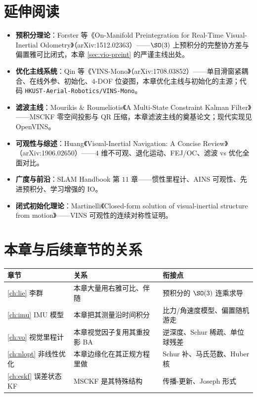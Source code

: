 \section*{延伸阅读}
\begin{itemize}
  \item \textbf{预积分理论}：Forster 等《On-Manifold Preintegration for Real-Time Visual-Inertial Odometry》\cite{forster2017preintegration}（arXiv:1512.02363）——$\SO(3)$ 上预积分的完整协方差与偏置雅可比闭式，本章 \cref{sec:vio-preint} 的严谨主线出处。
  \item \textbf{优化主线系统}：Qin 等《VINS-Mono》\cite{qin2018vins}（arXiv:1708.03852）——单目滑窗紧耦合、在线外参、初始化、$4$-DOF 位姿图，本章优化主线与初始化的主源；代码 \texttt{HKUST-Aerial-Robotics/\allowbreak VINS-Mono}。
  \item \textbf{滤波主线}：Mourikis \& Roumeliotis《A Multi-State Constraint Kalman Filter》\cite{mourikis2007msckf}——MSCKF 零空间投影与 QR 压缩，本章滤波主线的奠基论文；现代实现见 OpenVINS。
  \item \textbf{可观性与综述}：Huang《Visual-Inertial Navigation: A Concise Review》\cite{huang2019vins}（arXiv:1906.02650）——$4$ 维不可观、退化运动、FEJ/OC、滤波 vs 优化全面对比。
  \item \textbf{广度与前沿}：SLAM Handbook 第 $11$ 章\cite{carlone2026handbook}——惯性里程计、AINS 可观性、先进预积分、学习增强的 IO。
  \item \textbf{闭式初始化理论}：Martinelli《Closed-form solution of visual-inertial structure from motion》\cite{martinelli2014closed}——VINS 可观性的连续对称性证明。
\end{itemize}

\section*{本章与后续章节的关系}
\begin{table}[H]\centering\small
\begin{tabular}{lll}
\toprule
章节 & 关系 & 衔接点 \\
\midrule
\cref{ch:lie} 李群 & 本章大量用右雅可比、伴随 & 预积分的 $\SO(3)$ 连乘求导 \\
\cref{ch:imu} IMU 模型 & 本章把其测量沿时间积分 & 比力/角速度模型、偏置随机游走 \\
\cref{ch:vo} 视觉里程计 & 本章视觉因子复用其重投影 BA & 逆深度、Schur 稀疏、单位球残差 \\
\cref{ch:nlopt} 非线性优化 & 本章边缘化在其正规方程里做 & Schur 补、马氏范数、Huber 核 \\
\cref{ch:eskf} 误差状态 KF & MSCKF 是其特殊结构 & 传播-更新、Joseph 形式 \\
\bottomrule
\end{tabular}
\end{table}

